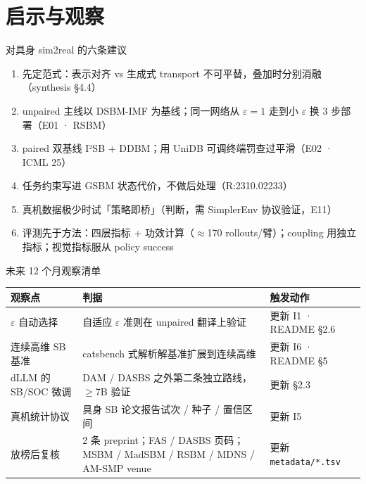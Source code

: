 \documentclass[aspectratio=169,10pt]{beamer}
\begin{document}
\section{启示与观察}
\begin{frame}{对具身 sim2real 的六条建议}
\begin{enumerate}
\item 先定范式：表示对齐 vs 生成式 transport 不可平替，叠加时分别消融（synthesis §4.4）
\item unpaired 主线以 DSBM-IMF 为基线；同一网络从 $\varepsilon=1$ 走到小 $\varepsilon$ 换 3 步部署（E01 · RSBM）
\item paired 双基线 I²SB + DDBM；用 UniDB 可调终端罚查过平滑（E02 · ICML 25）
\item 任务约束写进 GSBM 状态代价，不做后处理（R:2310.02233）
\item 真机数据极少时试「策略即桥」（判断，需 SimplerEnv 协议验证，E11）
\item 评测先于方法：四层指标 + 功效计算（$\approx$170 rollouts/臂）；coupling 用独立指标；视觉指标服从 policy success
\end{enumerate}
\end{frame}

\begin{frame}{未来 12 个月观察清单}
\vspace{4pt}
\begin{center}\small\begin{tabular}{P{2.6cm}p{6.4cm}p{4.0cm}}\toprule
观察点 & 判据 & 触发动作 \\\midrule
$\varepsilon$ 自动选择 & 自适应 $\varepsilon$ 准则在 unpaired 翻译上验证 & 更新 I1 · README §2.6 \\
连续高维 SB 基准 & catsbench 式解析解基准扩展到连续高维 & 更新 I6 · README §5 \\
dLLM 的 SB/SOC 微调 & DAM / DASBS 之外第二条独立路线，$\ge$7B 验证 & 更新 §2.3 \\
真机统计协议 & 具身 SB 论文报告试次 / 种子 / 置信区间 & 更新 I5 \\
放榜后复核 & 2 条 preprint；FAS / DASBS 页码；MSBM / MadSBM / RSBM / MDNS / AM-SMP venue & 更新 \texttt{metadata/*.tsv} \\\bottomrule
\end{tabular}\end{center}
\end{frame}
\end{document}
